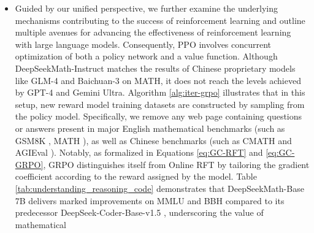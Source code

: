 \begin{itemize}[topsep=0pt]
\subsection{Group Relative Policy Optimization} Reinforcement learning (RL) methods have been shown to significantly enhance the mathematical problem-solving abilities of LLMs following Supervised Fine-Tuning (SFT) \citep{wang2023math,wizardmath}. \section{Discussion}
Here, we elaborate on the insights obtained from both the pre-training and reinforcement learning phases. This strategy enhances the corpus with more positive examples, enabling us to retrain the fastText model for higher recall of mathematical data in the following iteration. Robust mathematical capability can be obtained by pre-training smaller models with superior quality data. As detailed in Table \ref{tab:base_math_cot}, DeepSeekMath-Base 7B achieves superior results on all eight benchmarks when compared to other open-source base models—including the highly regarded Mistral 7B \citep{mistral} and the recently introduced Llemma 34B \citep{llemma}, which was specifically trained on mathematical data from Proof-Pile-2 \citep{llemma}. Therefore, our objective is to examine reinforcement learning strategies that exhibit resilience to noisy or unreliable reward feedback. Additionally, the results show that GRPO+PS achieves better outcomes than GRPO+OS, underscoring the value of employing step-specific, fine-grained gradient coefficients. The filtering rule stipulates that any textual segment featuring an exact 10-gram overlap with a substring from the benchmarks is excluded from our training data. \item Guided by our unified perspective, we further examine the underlying mechanisms contributing to the success of reinforcement learning and outline multiple avenues for advancing the effectiveness of reinforcement learning with large language models. Consequently, PPO involves concurrent optimization of both a policy network and a value function. Although DeepSeekMath-Instruct matches the results of Chinese proprietary models like GLM-4 and Baichuan-3 on MATH, it does not reach the levels achieved by GPT-4 and Gemini Ultra. Algorithm \ref{alg:iter-grpo} illustrates that in this setup, new reward model training datasets are constructed by sampling from the policy model. Specifically, we remove any web page containing questions or answers present in major English mathematical benchmarks (such as GSM8K \citep{gsm8k}, MATH \citep{MATH}), as well as Chinese benchmarks (such as CMATH \citep{wei2023cmath} and AGIEval \citep{agieval}). Notably, as formalized in Equations \ref{eq:GC-RFT} and \ref{eq:GC-GRPO}, GRPO distinguishes itself from Online RFT by tailoring the gradient coefficient according to the reward assigned by the model. Table \ref{tab:understanding_reasoning_code} demonstrates that DeepSeekMath-Base 7B delivers marked improvements on MMLU and BBH compared to its predecessor DeepSeek-Coder-Base-v1.5 \citep{deepseek-coder}, underscoring the value of mathematical 
\end{itemize}
